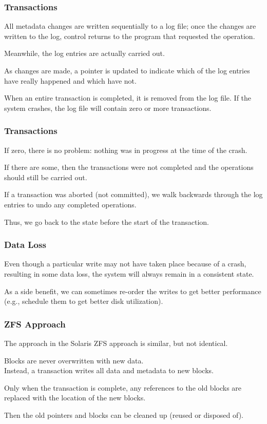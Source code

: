 \begin{frame}
\frametitle{Transactions}

All metadata changes are written sequentially to a log file; once the changes are written to the log, control returns to the program that requested the operation. 

Meanwhile, the log entries are actually carried out. 

As changes are made, a pointer is updated to indicate which of the log entries have really happened and which have not.

When an entire transaction is completed, it is removed from the log file. If the system crashes, the log file will contain zero or more transactions.
\end{frame}

\begin{frame}
\frametitle{Transactions}

If zero, there is no problem: nothing was in progress at the time of the crash. 

If there are some, then the transactions were not completed and the operations should still be carried out. 

If a transaction was aborted (not committed), we walk backwards through the log entries to undo any completed operations.

Thus, we go back to the state before the start of the transaction.




\end{frame}

\begin{frame}
\frametitle{Data Loss}

Even though a particular write may not have taken place because of a crash, resulting in some data loss, the system will always remain in a consistent state. 

As a side benefit, we can sometimes re-order the writes to get better performance (e.g., schedule them to get better disk utilization). 


\end{frame}

\begin{frame}
\frametitle{ZFS Approach}

The approach in the Solaris ZFS approach is similar, but not identical. 

Blocks are never overwritten with new data.\\
\quad Instead, a transaction writes all data and metadata to new blocks. 

Only when the transaction is complete, any references to the old blocks are replaced with the location of the new blocks. 


Then the old pointers and blocks can be cleaned up (reused or disposed of). 


\end{frame}



